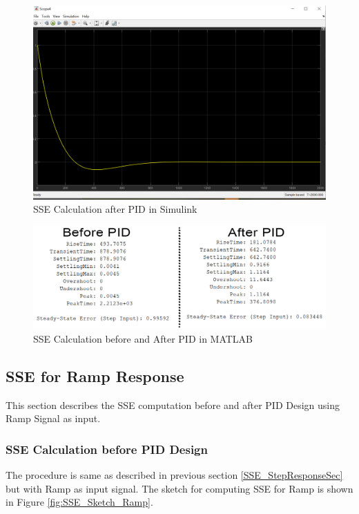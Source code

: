 \documentclass{article}
\begin{document}
\begin{figure}[h!]
	\centering
	\includegraphics[scale=0.45]{images/SSE_AfterPID_Simulink.png}
	\caption{SSE Calculation after PID in Simulink}
	\label{fig:SSE_AfterPID_Simulink}
\end{figure}

\begin{figure}[h!]
	\centering
	\includegraphics[scale=0.75]{images/SSE_MATLAB.png}
	\caption{SSE Calculation before and After PID in MATLAB}
	\label{fig:SSE_MATLAB}
\end{figure}

\subsection{SSE for Ramp Response}
This section describes the SSE computation before and after PID Design using Ramp Signal as input.

\subsubsection{SSE Calculation before PID Design}
The procedure is same as described in previous section \ref{SSE_StepResponseSec} but with Ramp as input signal. The sketch for computing SSE for Ramp is shown in Figure \ref{fig:SSE_Sketch_Ramp}.
\end{document}
